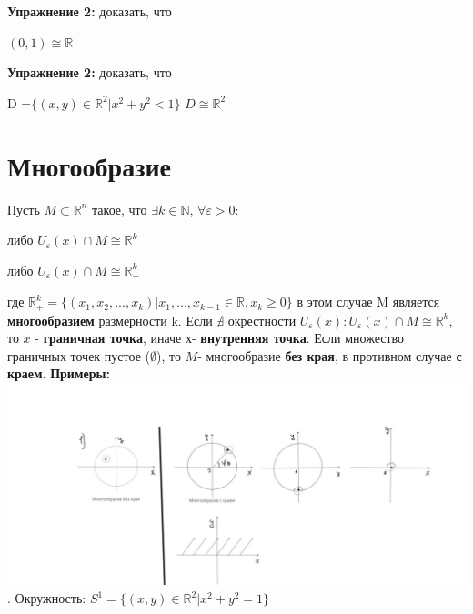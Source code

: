 \documentclass[12pt,a4paper]{article}
\begin{document}
	\textbf{\large{Упражнение 2:}} доказать, что 
	\begin{center}
	$(0,1) \cong  \mathbb{R}$
	\end{center}	
	
	\textbf{\large{Упражнение 2:}} доказать, что 
	\begin{center}
	D =$\{(x,y)\in \mathbb{R}^2 | x^2 + y^2 < 1\}$ 
	\newline $D\cong \mathbb{R}^2$ 
	\end{center}
	\newpage
\section*{Многообразие}

Пусть \(M \subset \mathbb{R}^n\) такое, что \(\exists k\in \mathbb{N}\), 
\( \forall \varepsilon >0\):
\begin{center}
 либо \(U_{\varepsilon} (x)\cap M \cong \mathbb{R}^k\)
\end{center}
\begin{center}
 либо \(U_{\varepsilon} (x)\cap M \cong \mathbb{R}_{+}^k\)
\end{center}
где \(\mathbb{R}_{+}^k = \{(x_1,x_2,...,x_k)| x_1,..., x_{k-1} \in \mathbb{R}, x_k\ge 0\}\)
\newline в этом случае M является \underline{\textbf{многообразием}} размерности k.
\newline Если \(\nexists\) окрестности \(U_{\varepsilon} (x): U_{\varepsilon} (x)\cap M \cong \mathbb{R}^k\), то \(x\) - \textbf{граничная точка}, иначе \(х\)- \textbf{внутренняя точка}.
\newline Если множество граничных точек пустое (\(\emptyset\)), то \(M\)- многообразие \textbf{без края}, в противном случае \textbf{с краем}.
\newline \textbf{Примеры:}
\newline \includegraphics[scale=0.7]{image1.jpg}
. Окружность: \(S^1 = \{(x,y)\in \mathbb{R}^2| x^2 + y^2 =1\}\) 
\end{document}
